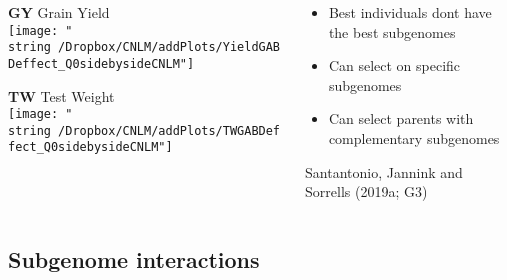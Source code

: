 \documentclass[11pt, aspectratio=169]{beamer}
\begin{document}
\begin{frame}
\begin{columns}
\begin{column}{0.7\linewidth}
  \raggedright{\small \textbf{GY} Grain Yield}\\
\centering
  \texttt{[image: "\\string~/Dropbox/CNLM/addPlots/YieldGABDeffect\_Q0sidebysideCNLM"]} 

\raggedright{\small \textbf{TW} Test Weight}\\
\centering
\texttt{[image: "\\string~/Dropbox/CNLM/addPlots/TWGABDeffect\_Q0sidebysideCNLM"]}
\end{column}
\begin{column}{0.3\linewidth}
\centering
{}
\vspace{5mm}
\begin{itemize}
  \item Best individuals dont have the best subgenomes
  \item Can select on specific subgenomes
  \item Can select parents with complementary subgenomes
\end{itemize}
\vspace{16mm}
\tiny{Santantonio, Jannink and Sorrells (2019a; G3)}

\end{column}
\end{columns}
\end{frame}


\subsection{Subgenome interactions}
\end{document}
